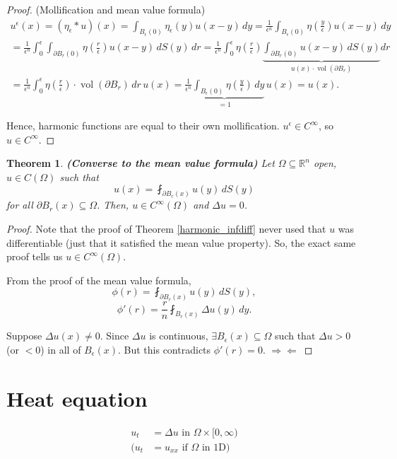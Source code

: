 \documentclass[12pt]{article}
\DeclareMathOperator{\vol}{vol}
\newtheorem{theorem}{Theorem}[section]
\theoremstyle{definition}
\begin{document}
\begin{proof}
(Mollification and mean value formula)
\begin{multline*}
u^{\epsilon}(x)=(\eta_{\epsilon}*u)(x)=\int_{B_{\epsilon}(0)}\eta_{\epsilon}(y)u(x-y)\,dy=\frac{1}{\epsilon^n}\int_{B_{\epsilon}(0)}\eta\left(\frac{y}{\epsilon}\right)u(x-y)\,dy\\
=\frac{1}{\epsilon^n}\int_0^{\epsilon}\int_{\partial B_r(0)}\eta\left(\frac{r}{\epsilon}\right)u(x-y)\,dS(y)\,dr=\frac{1}{\epsilon^n}\int_0^{\epsilon}\eta\left(\frac{r}{\epsilon}\right)\underbrace{\int_{\partial B_r(0)}u(x-y)\,dS(y)}_{u(x)\cdot\vol(\partial B_r)}dr\\
=\frac{1}{\epsilon^n}\int_0^{\epsilon}\eta\left(\frac{r}{\epsilon}\right)\cdot\vol(\partial B_r)\,dr\,u(x)=\underbrace{\frac{1}{\epsilon^n}\int_{B_{\epsilon}(0)}\eta\left(\frac{y}{\epsilon}\right)\,dy}_{=1}\,u(x)=u(x).
\end{multline*}

Hence, harmonic functions are equal to their own mollification. $u^{\epsilon}\in C^{\infty}$, so $u\in C^{\infty}$.
\end{proof}

\begin{theorem}
\emph{\textbf{(Converse to the mean value formula)}} Let $\Omega\subseteq\mathbb{R}^n$ open, $u\in C(\Omega)$ such that
\[u(x)=\fint_{\partial B_r(x)}u(y)\,dS(y)\]
for all $\partial B_r(x)\subseteq\Omega$. Then, $u\in C^{\infty}(\Omega)$ and $\Delta u=0$.
\end{theorem}

\begin{proof}
Note that the proof of Theorem \ref{harmonic_infdiff} never used that $u$ was differentiable (just that it satisfied the mean value property). So, the exact same proof tells us $u\in C^{\infty}(\Omega)$.

From the proof of the mean value formula,
\[\phi(r)=\fint_{\partial B_r(x)}u(y)\,dS(y),\]
\[\phi'(r)=\frac{r}{n}\fint_{B_r(x)}\Delta u(y)\,dy.\]

Suppose $\Delta u(x)\neq0$. Since $\Delta u$ is continuous, $\exists B_{\epsilon}(x)\subseteq\Omega$ such that $\Delta u>0$ (or $<0$) in all of $B_{\epsilon}(x)$. But this contradicts $\phi'(r)=0$. $\Rightarrow\Leftarrow$
\end{proof}

\section{Heat equation}\label{heat_equation}
\begin{align*}
u_t&=\Delta u\text{ in }\Omega\times[0,\infty)\\
(u_t&=u_{xx}\text{ if }\Omega\text{ in 1D})
\end{align*}
\end{document}
